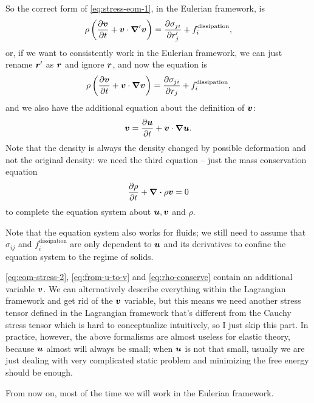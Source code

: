 \documentclass[hyperref, a4paper]{article}
\begin{document}
So the correct form of \eqref{eq:stress-eom-1},
in the Eulerian framework, is 
\begin{equation}
    \rho \left(
        \pdv{\vb*{v}}{t} + \vb*{v} \cdot \grad' \vb*{v}
    \right) = \pdv{\sigma_{ji}}{r_j'} + f_i^{\text{dissipation}},
\end{equation}
or, if we want to consistently work in the Eulerian framework,
we can just rename $\vb*{r}'$ as $\vb*{r}$
and ignore $\vb*{r}$,
and now the equation is 
\begin{equation}
    \rho \left(
        \pdv{\vb*{v}}{t} + \vb*{v} \cdot \grad \vb*{v}
    \right) = \pdv{\sigma_{ji}}{r_j} + f_i^{\text{dissipation}},
    \label{eq:eom-stress-2}
\end{equation}
and we also have the additional equation about the definition of $\vb*{v}$:
\begin{equation}
    \vb*{v} = \pdv{\vb*{u}}{t} + \vb*{v} \cdot \grad \vb*{u}.
    \label{eq:from-u-to-v}
\end{equation}
Note that the density is always the density changed by possible deformation
and not the original density:
we need the third equation -- just the mass conservation equation 
\begin{equation}
    \pdv{\rho}{t} + \div{\rho \vb*{v}} = 0
    \label{eq:rho-conserve}
\end{equation}
to complete the equation system about $\vb*{u}, \vb*{v}$ and $\rho$.

Note that the equation system also works for fluids;
we still need to assume that $\sigma_{ij}$ and $f_i^\text{dissipation}$
are only dependent to $\vb*{u}$ and its derivatives
to confine the equation system to the regime of solids. 

\eqref{eq:eom-stress-2}, \eqref{eq:from-u-to-v} and \eqref{eq:rho-conserve}
contain an additional variable $\vb*{v}$.
We can alternatively describe everything within the Lagrangian framework
and get rid of the $\vb*{v}$ variable,
but this means we need another stress tensor defined in the Lagrangian framework
that's different from the Cauchy stress tensor
which is hard to conceptualize intuitively,
so I just skip this part.
In practice, however, the above formalisms are almost useless for elastic theory,
because $\vb*{u}$ almost will always be small;
when $\vb*{u}$ is not that small, 
usually we are just dealing with very complicated static problem 
and minimizing the free energy should be enough.

From now on, most of the time we will work in the Eulerian framework.
\end{document}
